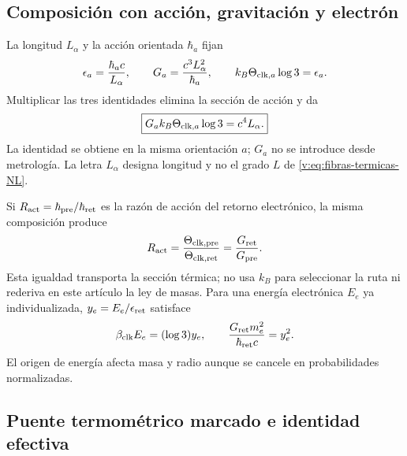 \subsection{Composición con acción, gravitación y electrón}

La longitud $L_\alpha$ y la acción orientada $\hbar_a$ fijan
\begin{equation}
 \epsilon_a=\frac{\hbar_ac}{L_\alpha},\qquad
 G_a=\frac{c^3L_\alpha^2}{\hbar_a},\qquad
 k_B\Theta_{{\rm clk},a}\log3=\epsilon_a.
 \label{v:eq:triple-accion-gravedad-temperatura}
\end{equation}
Multiplicar las tres identidades elimina la sección de acción y da
\begin{equation}
 \boxed{G_a k_B\Theta_{{\rm clk},a}\log3=c^4L_\alpha.}
 \label{v:eq:identidad-gravedad-temperatura}
\end{equation}
La identidad se obtiene en la misma orientación $a$; $G_a$ no se introduce
desde metrología. La letra $L_\alpha$ designa longitud y no el grado $L$ de
\eqref{v:eq:fibras-termicas-NL}.

Si $R_{\rm act}=\hbar_{\rm pre}/\hbar_{\rm ret}$ es la razón de acción del
retorno electrónico, la misma composición produce
\begin{equation}
 R_{\rm act}
 =\frac{\Theta_{{\rm clk,pre}}}{\Theta_{{\rm clk,ret}}}
 =\frac{G_{\rm ret}}{G_{\rm pre}}.
 \label{v:eq:retorno-accion-termico-gravitatorio}
\end{equation}
Esta igualdad transporta la sección térmica; no usa $k_B$ para seleccionar
la ruta ni rederiva en este artículo la ley de masas. Para una energía
electrónica $E_e$ ya individualizada, $y_e=E_e/\epsilon_{\rm ret}$ satisface
\[
 \beta_{\rm clk}E_e=(\log3)y_e,\qquad
 \frac{G_{\rm ret}m_e^2}{\hbar_{\rm ret}c}=y_e^2.
\]
El origen de energía afecta masa y radio aunque se cancele en probabilidades
normalizadas.

\subsection{Puente termométrico marcado e identidad efectiva}


